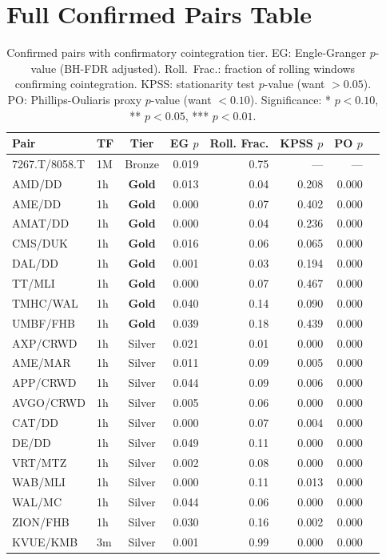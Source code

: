 \documentclass[12pt,a4paper]{article}
\begin{document}



\appendix

\section{Full Confirmed Pairs Table}
\begin{table}[htbp]
\centering
\footnotesize
\caption{Confirmed pairs with confirmatory cointegration tier. EG: Engle-Granger $p$-value (BH-FDR adjusted). Roll.\ Frac.: fraction of rolling windows confirming cointegration. KPSS: stationarity test $p$-value (want $>0.05$). PO: Phillips-Ouliaris proxy $p$-value (want $<0.10$). Significance: * $p<0.10$, ** $p<0.05$, *** $p<0.01$.}
\label{tab:confirmed_pairs}
\begin{tabular}{llcrrrrr}
\toprule
Pair & TF & Tier & EG $p$ & Roll. Frac. & KPSS $p$ & PO $p$ \\
\midrule
7267.T/8058.T & 1M & Bronze & 0.019 & 0.75 & --- & --- \\
AMD/DD & 1h & \textbf{Gold} & 0.013 & 0.04 & 0.208 & 0.000 \\
AME/DD & 1h & \textbf{Gold} & 0.000 & 0.07 & 0.402 & 0.000 \\
AMAT/DD & 1h & \textbf{Gold} & 0.000 & 0.04 & 0.236 & 0.000 \\
CMS/DUK & 1h & \textbf{Gold} & 0.016 & 0.06 & 0.065 & 0.000 \\
DAL/DD & 1h & \textbf{Gold} & 0.001 & 0.03 & 0.194 & 0.000 \\
TT/MLI & 1h & \textbf{Gold} & 0.000 & 0.07 & 0.467 & 0.000 \\
TMHC/WAL & 1h & \textbf{Gold} & 0.040 & 0.14 & 0.090 & 0.000 \\
UMBF/FHB & 1h & \textbf{Gold} & 0.039 & 0.18 & 0.439 & 0.000 \\
AXP/CRWD & 1h & Silver & 0.021 & 0.01 & 0.000 & 0.000 \\
AME/MAR & 1h & Silver & 0.011 & 0.09 & 0.005 & 0.000 \\
APP/CRWD & 1h & Silver & 0.044 & 0.09 & 0.006 & 0.000 \\
AVGO/CRWD & 1h & Silver & 0.005 & 0.06 & 0.000 & 0.000 \\
CAT/DD & 1h & Silver & 0.000 & 0.07 & 0.004 & 0.000 \\
DE/DD & 1h & Silver & 0.049 & 0.11 & 0.000 & 0.000 \\
VRT/MTZ & 1h & Silver & 0.002 & 0.08 & 0.000 & 0.000 \\
WAB/MLI & 1h & Silver & 0.000 & 0.11 & 0.013 & 0.000 \\
WAL/MC & 1h & Silver & 0.044 & 0.06 & 0.000 & 0.000 \\
ZION/FHB & 1h & Silver & 0.030 & 0.16 & 0.002 & 0.000 \\
KVUE/KMB & 3m & Silver & 0.001 & 0.99 & 0.000 & 0.000 \\
\bottomrule
\end{tabular}
\end{table}
\end{document}
